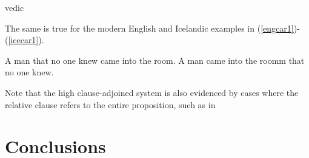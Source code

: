 \begin{exe}

\ex \label{vedicrel} vedic 
\citep[][23]{kiparsky1995}
\end{exe}

\noindent The same is true for the modern English and Icelandic examples in (\ref{engcar1})-(\ref{icecar1}).

\begin{exe}
         \ex \label{engcar1} A man that no one knew came into the room.
         \ex \label{icecar1} A man came into the roomm that no one knew.

\end{exe}

\noindent Note that the high clause-adjoined system is also evidenced by cases where the relative clause refers to the entire proposition, such as in 




\section{Conclusions}












%
%



